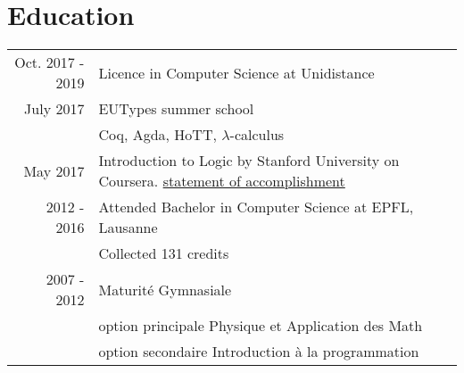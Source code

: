 \documentclass[a4paper,10pt]{article} %
\begin{document}

\section{Education}
\renewcommand{\arraystretch}{1.3}
\begin{tabular}{rl}	
Oct. 2017 - 2019 & Licence in Computer Science at Unidistance  \\ 

July 2017 & EUTypes summer school \\&\footnotesize{Coq, Agda, HoTT, $\lambda$-calculus} \\
May 2017 & Introduction to Logic by Stanford University on Coursera. \footnotesize{\href{https://www.coursera.org/account/accomplishments/certificate/RPGEPLA94HFF}{statement of accomplishment}}\\
2012 - 2016 & Attended Bachelor in Computer Science at EPFL, Lausanne\\
& \footnotesize{Collected 131 credits}\\


2007 - 2012 & Maturité Gymnasiale\\ & option principale Physique et Application des Math\\ & option secondaire Introduction à la programmation\\
\end{tabular}

\end{document}
